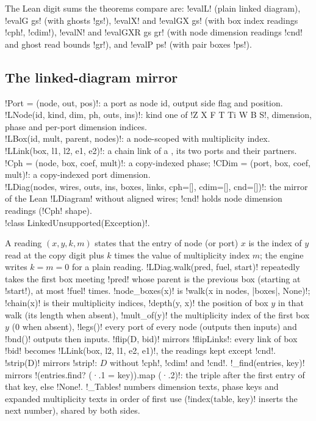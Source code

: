 {{{The Lean digit sums the theorems compare are: \lexlean!evalL! (plain linked diagram),
\lexlean!evalG gs! (with ghosts \lexlean!gs!), \lexlean!evalX! and \lexlean!evalGX gs! (with box index
readings \lexlean!cph!, \lexlean!cdim!), \lexlean!evalN! and \lexlean!evalGXR gs gr! (with node dimension
readings \lexlean!cnd! and ghost read bounds \lexlean!gr!), and \lexlean!evalP ps! (with pair boxes
\lexlean!ps!).

\subsection{The linked-diagram mirror}

\begin{signature}
\lexpy!Port = (node, out, pos)!: a port as node id, output side flag and position.\\
\lexpy!LNode(id, kind, dim, ph, outs, ins)!: kind one of \lexcode!Z X F T Ti W B S!, dimension, phase
and per-port dimension indices.\\
\lexpy!LBox(id, mult, parent, nodes)!: a node-scoped \bbox with multiplicity index.\\
\lexpy!LLink(box, l1, l2, e1, e2)!: a chain link of a \bbox, its two ports and their partners.\\
\lexpy!Cph = (node, box, coef, mult)!: a copy-indexed phase; \lexpy!CDim = (port, box, coef, mult)!:
a copy-indexed port dimension.\\
\lexpy!LDiag(nodes, wires, outs, ins, boxes, links, cph=[], cdim=[], cnd=[])!: the mirror of the Lean
\lexlean!LDiagram! without aligned wires; \lexcode!cnd! holds node dimension readings (\lexpy!Cph! shape).\\
\lexpy!class LinkedUnsupported(Exception)!.
\end{signature}
A reading $(x, y, k, m)$ states that the entry of node (or port) $x$ is the index of \bbox $y$
read at the copy digit plus $k$ times the value of multiplicity index $m$; the engine writes
$k = m = 0$ for a plain reading. \lexpy!LDiag.walk(pred, fuel, start)! repeatedly takes the first box
meeting \lexcode!pred! whose parent is the previous box (starting at \lexcode!start!), at most
\lexcode!fuel! times. \lexpy!node_boxes(x)! is \lexpy!walk(x in nodes, |boxes|, None)!; \lexpy!chain(x)! is
their multiplicity indices, \lexpy!depth(y, x)! the position of box $y$ in that walk (its length
when absent), \lexpy!mult_of(y)! the multiplicity index of the first box $y$ (0 when absent),
\lexpy!legs()! every port of every node (outputs then inputs) and \lexpy!bnd()! outputs then inputs.
\lexpy!flip(D, bid)! mirrors \lexlean!flipLinks!: every link of box \lexcode!bid! becomes
\lexpy!LLink(box, l2, l1, e2, e1)!, the readings kept except \lexcode!cnd!. \lexpy!strip(D)! mirrors
\lexlean!strip!: $D$ without \lexcode!cph!, \lexcode!cdim! and \lexcode!cnd!. \lexpy!_find(entries, key)! mirrors
\lexlean!(entries.find? (·.1 = key)).map (·.2)!: the triple after the first entry of that key, else
\lexpy!None!. \lexpy!_Tables! numbers dimension texts, phase keys and expanded multiplicity texts in
order of first use (\lexpy!index(table, key)! inserts the next number), shared by both sides.

}}}
